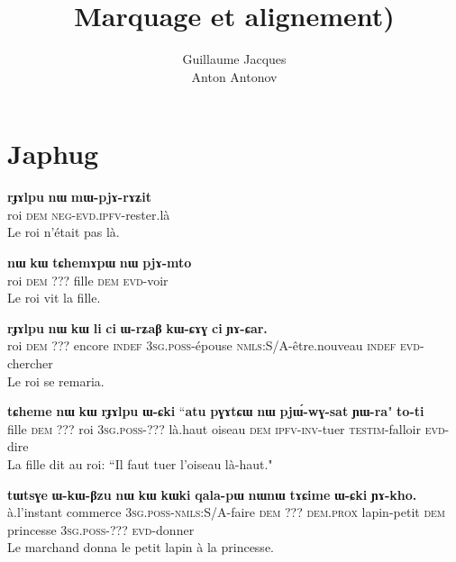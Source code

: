 \documentclass[oldfontcommands,twoside,a4paper,12pt]{article}
\newcommand{\ipa}[1]{{\phon\textbf{#1}}}
\begin{document}
\title{Marquage et alignement)}
\author{Guillaume Jacques\\Anton Antonov}
\maketitle

\section{Japhug}
 \begin{exe}
\ex
\gll
\ipa{rɟɤlpu}  	\ipa{nɯ}  	\ipa{mɯ-pjɤ-rɤʑit}  \\
roi \textsc{dem} \textsc{neg-evd.ipfv}-rester.là \\
 \glt Le roi n'était pas là.
\end{exe}

 \begin{exe}
\ex 
\gll \ipa{rɟɤlpu}  	\ipa{nɯ}  	\ipa{kɯ}  	\ipa{tɕhemɤpɯ}  	\ipa{nɯ}  	\ipa{pjɤ-mto}   \\
roi \textsc{dem} ??? fille \textsc{dem} \textsc{evd}-voir \\
\glt Le roi vit la fille.
\end{exe}

 \begin{exe}
\ex 
\gll 
\ipa{rɟɤlpu}  	\ipa{nɯ}  	\ipa{kɯ}  	\ipa{li}  	\ipa{ci}  	\ipa{ɯ-rʑaβ}  	\ipa{kɯ-ɕɤɣ}  	\ipa{ci}  	\ipa{ɲɤ-ɕar.}  	 \\
roi \textsc{dem} ??? encore \textsc{indef} \textsc{3sg.poss}-épouse \textsc{nmls}:S/A-être.nouveau \textsc{indef}  \textsc{evd}-chercher \\
\glt Le roi se remaria.
\end{exe}

 \begin{exe}
\ex 
\gll 
\ipa{tɕheme}  	\ipa{nɯ}  	\ipa{kɯ}  	\ipa{rɟɤlpu}  	\ipa{ɯ-ɕki}  	``\ipa{atu}  	\ipa{pɣɤtɕɯ}  	\ipa{nɯ}  	\ipa{pjɯ́-wɣ-sat}  	\ipa{ɲɯ-ra}"  	\ipa{to-ti}  	\\
fille \textsc{dem} ??? roi \textsc{3sg.poss}-??? là.haut oiseau \textsc{dem} \textsc{ipfv-inv}-tuer \textsc{testim}-falloir \textsc{evd}-dire \\
\glt La fille dit au roi: ``Il faut tuer l'oiseau là-haut."
\end{exe}


 \begin{exe}
\ex 
\gll \ipa{iɕqha}  	\ipa{tɯtsɣe}  	\ipa{ɯ-kɯ-βzu}  	\ipa{nɯ}  	\ipa{kɯ}  	\ipa{kɯki}  	\ipa{qala-pɯ}  	\ipa{nɯnɯ}  	\ipa{tɤɕime}  	\ipa{ɯ-ɕki}  	\ipa{ɲɤ-kho.}  	\\
à.l'instant commerce \textsc{3sg.poss-nmls}:S/A-faire \textsc{dem} ??? \textsc{dem.prox} lapin-petit \textsc{dem} princesse \textsc{3sg.poss}-??? \textsc{evd}-donner \\
\glt Le marchand donna le petit lapin à la princesse.
\end{exe}
\end{document}

